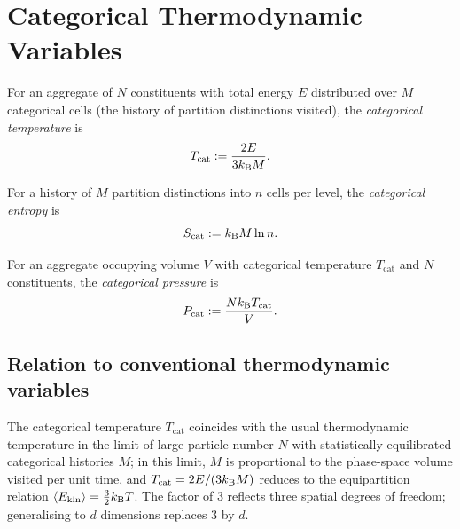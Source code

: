 \section{Categorical Thermodynamic Variables}
\label{sec:catthermo}

\begin{definition}
\label{def:cattemp}
For an aggregate of $N$ constituents with total energy $E$ distributed over $M$ categorical cells (the history of partition distinctions visited), the \emph{categorical temperature} is
\begin{equation}
T_{\mathrm{cat}}:=\frac{2E}{3k_{\mathrm{B}} M}.
\label{eq:Tcat}
\end{equation}
\end{definition}

\begin{definition}
\label{def:catent}
For a history of $M$ partition distinctions into $n$ cells per level, the \emph{categorical entropy} is
\begin{equation}
S_{\mathrm{cat}}:=k_{\mathrm{B}} M\ln n.
\label{eq:Scat}
\end{equation}
\end{definition}

\begin{definition}
\label{def:catpress}
For an aggregate occupying volume $V$ with categorical temperature $T_{\mathrm{cat}}$ and $N$ constituents, the \emph{categorical pressure} is
\begin{equation}
P_{\mathrm{cat}}:=\frac{Nk_{\mathrm{B}} T_{\mathrm{cat}}}{V}.
\label{eq:Pcat}
\end{equation}
\end{definition}

\subsection{Relation to conventional thermodynamic variables}

The categorical temperature $T_{\text{cat}}$ coincides with the usual thermodynamic temperature in the limit of large particle number $N$ with statistically equilibrated categorical histories $M$; in this limit, $M$ is proportional to the phase-space volume visited per unit time, and $T_{\text{cat}}=2E/(3k_{\mathrm{B}} M)$ reduces to the equipartition relation $\langle E_{\text{kin}}\rangle=\tfrac{3}{2}k_{\mathrm{B}} T$. The factor of $3$ reflects three spatial degrees of freedom; generalising to $d$ dimensions replaces $3$ by $d$.

